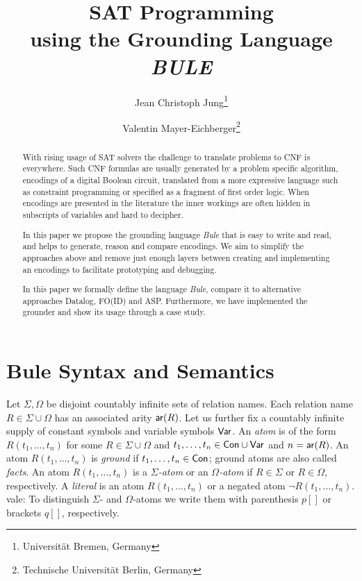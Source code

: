 \documentclass{new_tlp}
\title{ SAT Programming \\ using the Grounding Language \emph{BULE}}
\author{
    Jean Christoph Jung\footnote{Universität Bremen, Germany} \and 
    Valentin Mayer-Eichberger\footnote{Technische Universit\"at Berlin, Germany} 
}
\newcommand{\vale}[1]{\textcolor[rgb]{0.00,0.00,0.54296875}{vale: #1} }
\begin{document}
\maketitle

\begin{abstract}
    With rising usage of SAT solvers the challenge to translate problems to CNF is everywhere. 
    Such  CNF formulas are usually generated by a problem specific algorithm, encodings of a digital Boolean circuit, translated from a more expressive language such as constraint programming or specified as a fragment of first order logic. 
    When encodings are  presented in the literature the inner workings are often hidden in subscripts of variables and hard to decipher.

    In this paper we propose the grounding language \emph{Bule} that is easy to write and read, and helps to generate, reason and compare encodings. 
    We aim to simplify the approaches above and remove just enough layers between creating and implementing an encodings to facilitate prototyping and debugging. 

    In this paper we formally define the language \emph{Bule}, compare it to alternative approaches Datalog, FO(ID) and ASP. 
    Furthermore, we have implemented the grounder and show its usage through a case study.
\end{abstract}

\section{Bule Syntax and Semantics}

Let $\Sigma,\Omega$ be disjoint countably infinite sets of relation names. 
Each relation name $R\in \Sigma\cup\Omega$ has an associated arity $\mathsf{ar}(R)$. 
Let us further fix a countably infinite supply of constant symbols  and variable symbols $\mathsf{Var}$. 
An
\emph{atom} is of the form $R(t_1,\ldots,t_n)$ for some $R\in
\Sigma\cup\Omega$ and $t_1,\ldots,t_n\in\mathsf{Con}\cup\mathsf{Var}$ and
$n=\mathsf{ar}(R)$. 
An atom $R(t_1,\ldots,t_n)$ is \emph{ground} if $t_1,\ldots,t_n\in\mathsf{Con}$; ground atoms are also called \emph{facts}. An atom $R(t_1,\ldots,t_n)$ is a \emph{$\Sigma$-atom} or an \emph{$\Omega$-atom} if $R\in \Sigma$ or $R\in \Omega$, respectively. 
A \emph{literal} is an atom $R(t_1,\ldots,t_n)$ or a negated atom $\neg R(t_1,\ldots,t_n)$. 
\vale{To distinguish $\Sigma$- and $\Omega$-atoms we write them with parenthesis $p[]$ or brackets $q[]$, respectively. }
\end{document}
